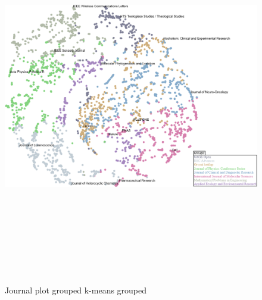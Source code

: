\documentclass[../../Thesis.tex]{subfiles}
\begin{document}
\begin{landscape}
\begin{figure}
\begin{center}
\includegraphics[height=6.5in]{Plots/journal_plot_grouped}
\end{center}
\caption{Journal plot grouped k-means grouped}\label{figure:journalPlotGroups}
\end{figure}
\end{landscape}
\end{document}
